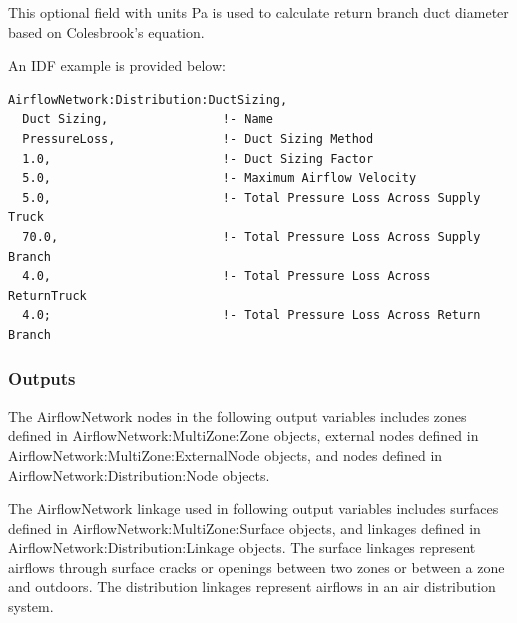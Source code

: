 This optional field with units Pa is used to calculate return branch duct diameter based on Colesbrook's equation.

An IDF example is provided below:

\begin{lstlisting}
AirflowNetwork:Distribution:DuctSizing,
  Duct Sizing,                !- Name
  PressureLoss,               !- Duct Sizing Method
  1.0,                        !- Duct Sizing Factor
  5.0,                        !- Maximum Airflow Velocity
  5.0,                        !- Total Pressure Loss Across Supply Truck
  70.0,                       !- Total Pressure Loss Across Supply Branch
  4.0,                        !- Total Pressure Loss Across ReturnTruck
  4.0;                        !- Total Pressure Loss Across Return Branch
\end{lstlisting}


\subsubsection{Outputs}\label{outputs-002}

The AirflowNetwork nodes in the following output variables includes zones defined in AirflowNetwork:MultiZone:Zone objects, external nodes defined in AirflowNetwork:MultiZone:ExternalNode objects, and nodes defined in AirflowNetwork:Distribution:Node objects.

The AirflowNetwork linkage used in following output variables includes surfaces defined in AirflowNetwork:MultiZone:Surface objects, and linkages defined in AirflowNetwork:Distribution:Linkage objects. The surface linkages represent airflows through surface cracks or openings between two zones or between a zone and outdoors. The distribution linkages represent airflows in an air distribution system.


